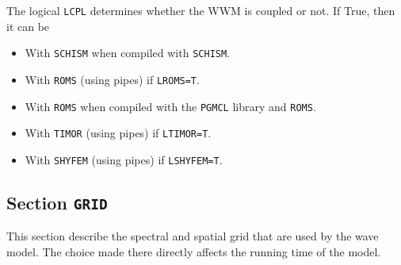 \documentclass[12pt]{amsart}
\begin{document}
The logical {\tt LCPL} determines whether the WWM is coupled or not.
If True, then it can be
\begin{itemize}
\item With {\tt SCHISM} when compiled with {\tt SCHISM}.
\item With {\tt ROMS} (using pipes) if {\tt LROMS=T}.
\item With {\tt ROMS} when compiled with the {\tt PGMCL} library and {\tt ROMS}.
\item With {\tt TIMOR} (using pipes) if {\tt LTIMOR=T}.
\item With {\tt SHYFEM} (using pipes) if {\tt LSHYFEM=T}.
\end{itemize}





\subsection{Section {\tt GRID}}
This section describe the spectral and spatial grid that are used by the wave model.
The choice made there directly affects the running time of the model.
\end{document}
